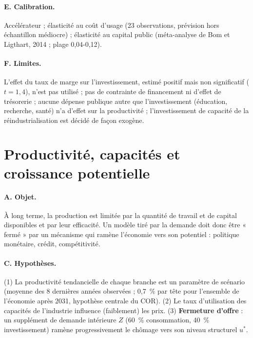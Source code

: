 \paragraph{E. Calibration.} Accélérateur  ; élasticité au coût d'usage  (23 observations,
prévision hors échantillon médiocre) ; élasticité au capital public  (méta-analyse de Bom et Ligthart, 2014 ;
plage 0,04-0,12).

\paragraph{F. Limites.} L'effet du taux de marge sur l'investissement, estimé positif mais non significatif ($t=1{,}4$),
n'est pas utilisé ; pas de contrainte de financement ni d'effet de trésorerie ; aucune dépense publique autre que
l'investissement (éducation, recherche, santé) n'a d'effet sur la productivité ; l'investissement de capacité de la
réindustrialisation est décidé de façon exogène.

\section{Productivité, capacités et croissance potentielle}
\label{sec:fermeture}

\paragraph{A. Objet.} À long terme, la production est limitée par la quantité de travail et de capital disponibles et par
leur efficacité. Un modèle tiré par la demande doit donc être « fermé » par un mécanisme qui ramène l'économie vers son
potentiel : politique monétaire, crédit, compétitivité.

\paragraph{C. Hypothèses.} (1) La productivité tendancielle de chaque branche est un paramètre de scénario (moyenne
des 8 dernières années observées ; 0,7~\% par tête pour l'ensemble de l'économie après 2031, hypothèse centrale du COR).
(2) Le taux d'utilisation des capacités de l'industrie influence (faiblement) les prix. (3) \textbf{Fermeture d'offre}
 : un supplément de demande intérieure $Z$ (60~\% consommation, 40~\% investissement) ramène progressivement
le chômage vers son niveau structurel $u^*$.

